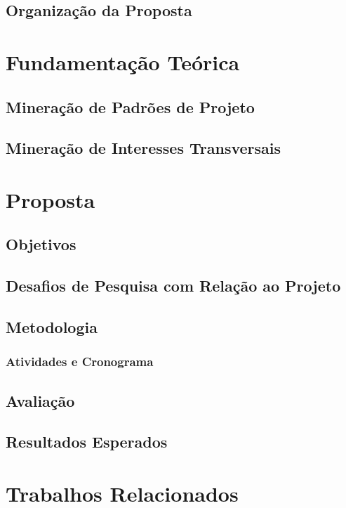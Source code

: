 \documentclass[a4paper,11pt]{article}
\begin{document}
	 	
	 
	 	

	
	\subsection{Organização da Proposta}\label{org}

\section{Fundamentação Teórica}\label{sec:fundamentacao}


\subsection{Mineração de Padrões de Projeto}\label{sub:mineracao}


 
\subsection{Mineração de Interesses Transversais}\label{sub:mineracao}


\section{Proposta}\label{sec:proposta}


\subsection{Objetivos}\label{sec:Objetivos}


\subsection{Desafios de Pesquisa com Relação ao Projeto}\label{desafios}

\subsection{Metodologia}\label{sec:metodologia}

   
\subsubsection{Atividades e Cronograma}\label{sec:atividadeECronograma}


\subsection{Avaliação}\label{sec:avaliacao}

\subsection{Resultados Esperados}\label{sec:ResultadosEsperados}

\section{Trabalhos Relacionados}\label{sec:relacionados}
 
     

\singlespacing 


\end{document}
